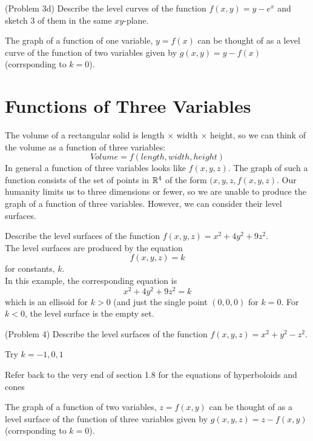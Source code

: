 \documentclass[handout]{ximera}
\begin{document}
\begin{problem}(Problem 3d)
Describe the level curves of the function $f(x,y) = y - e^x$ and sketch 3 of them in the same $xy$-plane.\\
\end{problem}

\begin{remark}
The graph of a function of one variable, $y= f(x)$ can be thought of as a level curve of the function of two variables given by $g(x, y) = y-f(x)$
(corrsponding to $k = 0$).
\end{remark}

\section{Functions of Three Variables}
The volume of a rectangular solid is length $\times$ width $\times $ height, so we can think of the volume as a function of three variables:
\[
Volume = f(length, width, height)
\]
In general a function of three variables looks like $f(x, y, z)$.
The graph of such a function consists of the set of points in $\mathbb R^4$ of the form $(x, y, z, f(x, y, z)$.
Our humanity limits us to three dimensions or fewer, so we are unable to produce the graph of a function of three variables.
However, we can consider their level surfaces.

\begin{example}[Example 4]
Describe the level surfaces of the function $f(x, y, z) = x^2 + 4y^2 + 9 z^2$.\\
The level surfaces are produced by the equation
\[
f(x, y, z) = k
\]
for constants, $k$.\\
In this example, the corresponding equation is
\[
x^2 + 4y^2 + 9z^2 = k
\]
which is an ellisoid for $k >0$ (and just the single point $(0, 0, 0)$ for $k = 0$.
For $k<0$, the level surface is the empty set.
\end{example}

\begin{problem}(Problem 4)
Describe the level surfaces of the function $f(x, y, z) = x^2 + y^2 - z^2$.\\
\begin{hint}
Try $k = -1, 0, 1$
\end{hint}
\begin{hint}
Refer back to the very end of section 1.8 for the equations of hyperboloids and cones
\end{hint}
\end{problem}

\begin{remark}
The graph of a function of two variables, $z= f(x,y)$ can be thought of as a level surface of the function of three variables given by $g(x, y, z) = z-f(x,y)$
(corrsponding to $k = 0$).
\end{remark}
\end{document}
